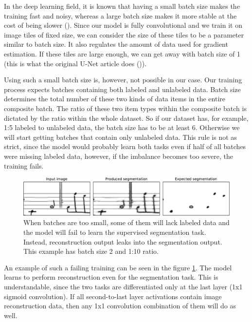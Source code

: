 In the deep learning field, it is known that having a small batch size makes the training fast and noisy, whereas a large batch size makes it more stable at the cost of being slower (\cite{DeepLearningBook}). Since our model is fully convolutional and we train it on image tiles of fixed size, we can consider the size of these tiles to be a parameter similar to batch size. It also regulates the amount of data used for gradient estimation. If these tiles are large enough, we can get away with batch size of 1 (this is what the original U-Net article does (\cite{UNet})).

Using such a small batch size is, however, not possible in our case. Our training process expects batches containing both labeled and unlabeled data. Batch size determines the total number of these two kinds of data items in the entire composite batch. The ratio of these two item types within the composite batch is dictated by the ratio within the whole dataset. So if our dataset has, for example, 1:5 labeled to unlabeled data, the batch size has to be at least 6. Otherwise we will start getting batches that contain only unlabeled data. This rule is not as strict, since the model would probably learn both tasks even if half of all batches were missing labeled data, however, if the imbalance becomes too severe, the training fails.

\begin{figure}[ht]
    \centering
    \includegraphics[width=145mm]{../../figures/07-small-batches/small-batches.pdf}
    \caption{When batches are too small, some of them will lack labeled data and the model will fail to learn the supervised segmentation task. Instead, reconstruction output leaks into the segmentation output. This example has batch size 2 and 1:10 ratio.}
    \label{fig:SmallBatches}
\end{figure}

An example of such a failing training can be seen in the figure \ref{fig:SmallBatches}. The model learns to perform reconstruction even for the segmentation task. This is understandable, since the two tasks are differentiated only at the last layer (1x1 sigmoid convolution). If all second-to-last layer activations contain image reconstruction data, then any 1x1 convolution combination of them will do as well.

